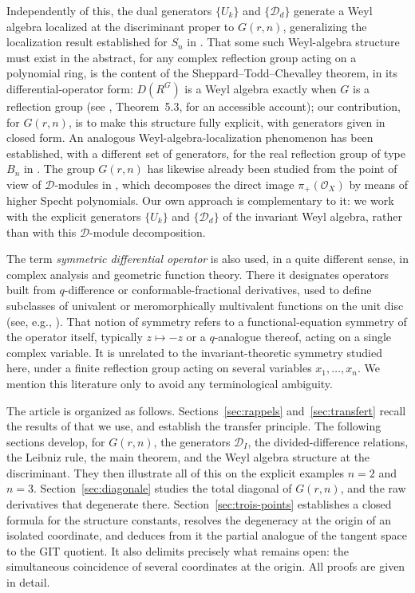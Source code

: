 \documentclass[10pt,a4paper]{amsart}
\begin{document}
Independently of this, the dual generators $\{U_k\}$ and $\{\mathcal D_d\}$ generate a Weyl algebra localized at the discriminant proper to $G(r,n)$, generalizing the localization result established for $S_n$ in \cite{N}. That some such Weyl-algebra structure must exist in the abstract, for any complex reflection group acting on a polynomial ring, is the content of the Sheppard--Todd--Chevalley theorem, in its differential-operator form: $D(R^G)$ is a Weyl algebra exactly when $G$ is a reflection group (see \cite{Tr}, Theorem~5.3, for an accessible account); our contribution, for $G(r,n)$, is to make this structure fully explicit, with generators given in closed form. An analogous Weyl-algebra-localization phenomenon has been established, with a different set of generators, for the real reflection group of type $B_n$ in \cite{NB}. The group $G(r,n)$ has likewise already been studied from the point of view of $\mathcal D$-modules in \cite{NL}, which decomposes the direct image $\pi_+(\mathcal O_X)$ by means of higher Specht polynomials. Our own approach is complementary to it: we work with the explicit generators $\{U_k\}$ and $\{\mathcal D_d\}$ of the invariant Weyl algebra, rather than with this $\mathcal D$-module decomposition.

The term \emph{symmetric differential operator} is also used, in a quite different sense, in complex analysis and geometric function theory. There it designates operators built from $q$-difference or conformable-fractional derivatives, used to define subclasses of univalent or meromorphically multivalent functions on the unit disc (see, e.g., \cite{IDarus,IAldawish,IEO}). That notion of symmetry refers to a functional-equation symmetry of the operator itself, typically $z\mapsto -z$ or a $q$-analogue thereof, acting on a single complex variable. It is unrelated to the invariant-theoretic symmetry studied here, under a finite reflection group acting on several variables $x_1,\dots,x_n$. We mention this literature only to avoid any terminological ambiguity.

The article is organized as follows. Sections~\ref{sec:rappels} and~\ref{sec:transfert} recall the results of \cite{Ze} that we use, and establish the transfer principle. The following sections develop, for $G(r,n)$, the generators $\mathcal D_I$, the divided-difference relations, the Leibniz rule, the main theorem, and the Weyl algebra structure at the discriminant. They then illustrate all of this on the explicit examples $n=2$ and $n=3$. Section~\ref{sec:diagonale} studies the total diagonal of $G(r,n)$, and the raw derivatives that degenerate there. Section~\ref{sec:trois-points} establishes a closed formula for the structure constants, resolves the degeneracy at the origin of an isolated coordinate, and deduces from it the partial analogue of the tangent space to the GIT quotient. It also delimits precisely what remains open: the simultaneous coincidence of several coordinates at the origin. All proofs are given in detail.
\end{document}
